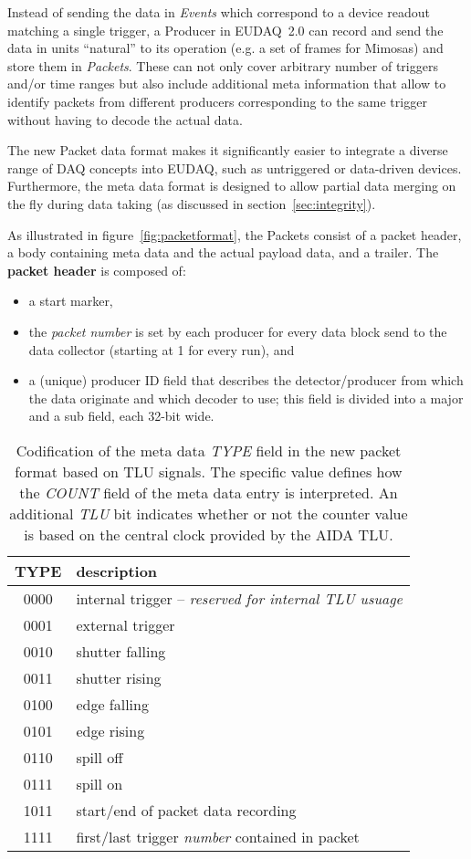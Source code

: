 \documentclass[paper=a4, fontsize=11pt, titlepage]{scrartcl}	%
\numberwithin{equation}{section}		%
\numberwithin{figure}{section}			%
\numberwithin{table}{section}           	%
\begin{document}
Instead of sending the data in \emph{Events} which correspond to a
device readout matching a single trigger, a Producer in EUDAQ~2.0 can
record and send the data in units ``natural'' to its operation (e.g. a set of
frames for Mimosas) and store them in \emph{Packets}. These can not only cover
arbitrary number of triggers and/or time ranges but also include
additional meta information that allow to identify packets from
different producers corresponding to the same trigger without having
to decode the actual data. 

The new Packet data format makes it significantly easier to 
integrate a diverse range of DAQ concepts into EUDAQ, such as untriggered or
data-driven devices. Furthermore, the meta data format is designed to allow partial data merging on
the fly during data taking (as discussed in section~\ref{sec:integrity}).

As illustrated in figure~\ref{fig:packetformat}, the Packets consist
of a packet header, a body containing meta data and the actual payload
data, and a trailer. The \textbf{packet header} is composed of:
  \begin{itemize}
  \item a start marker,
  \item the \emph{packet number} is set by each producer for
    every data block send to the data collector (starting at 1 for
    every run), and 
  \item a (unique) producer ID field that describes the
    detector/producer from which the data originate and which decoder
    to use; this field is divided into a major and a sub field, each
    32-bit wide.
  \end{itemize}

  \begin{table}[htbp]
    \centering
    \begin{tabular}{cl}
    \toprule
    \textbf{TYPE} & \textbf{description} \\
    \midrule
    0000 &  internal trigger -- \emph{reserved for internal TLU usuage}\\
    0001 &  external trigger\\
    0010 &  shutter falling \\
    0011 &  shutter rising  \\
    0100 &  edge falling    \\
    0101 &  edge rising     \\
    0110 &  spill off       \\
    0111 &  spill on        \\
    1011 & start/end of packet data recording \\
    1111 & first/last trigger \emph{number} contained in packet \\
    \bottomrule
  \end{tabular}
  \caption{Codification of the meta data \emph{TYPE} field in the new
    packet format based on TLU signals\cite{tlu2014}. The specific
    value defines how the \emph{COUNT} field of the meta data entry is
    interpreted. An additional \emph{TLU} bit indicates whether or not the counter value
    is based on the central clock provided by the AIDA TLU.}
\label{tab:typefield}
\end{table}
\end{document}
